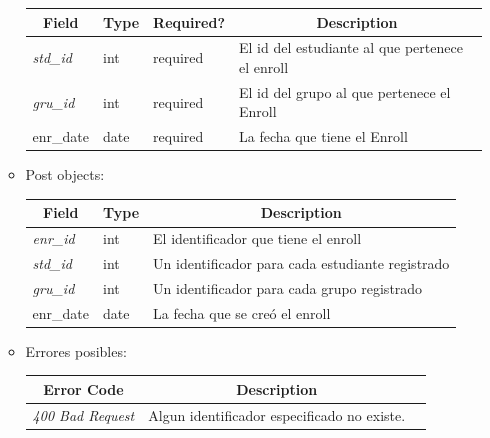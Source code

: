 \documentclass{article}
\begin{document}
\begin{enumerate}
\begin{itemize}
\begin{table}[H]
\begin{tabular}{|l|l|l|l|}
        \multicolumn{1}{|c|}{\textbf{Field}} &
        \multicolumn{1}{c|}{\textbf{Type}} &
        \multicolumn{1}{c|}{\textbf{Required?}} &
        \multicolumn{1}{c|}{\textbf{Description}} \\ \hline \textit{std\_id} &
        int & required & El id del estudiante al que pertenece el enroll \\
        \hline \textit{gru\_id} & int & required & El id del grupo al que
        pertenece el Enroll \\ \hline enr\_date & date & required & La fecha que
        tiene el Enroll \\ \hline \end{tabular} \end{table}
        \item Post objects:
        \begin{table}[H] \centering \begin{tabular}{|l|l|l|} \hline
        \multicolumn{1}{|c|}{\textbf{Field}} &
        \multicolumn{1}{c|}{\textbf{Type}} &
        \multicolumn{1}{c|}{\textbf{Description}} \\ \hline \textit{enr\_id} &
        int & El identificador que tiene el enroll \\ \hline \textit{std\_id} &
        int & Un identificador para cada estudiante registrado \\ \hline
        \textit{gru\_id} & int & Un identificador para cada grupo registrado \\
        \hline enr\_date & date & La fecha que se creó el enroll \\ \hline
        \end{tabular} \end{table}
        \item Errores posibles:
        \begin{table}[H] \centering \begin{tabular}{|c|c|l|} \hline \textbf{Error Code}
        & \textbf{Description} \\ \hline \textit{400 Bad Request} & Algun 
        identificador especificado no existe. \\ \hline \end{tabular}
        \end{table}
    \end{itemize}


\end{enumerate}
\end{document}
